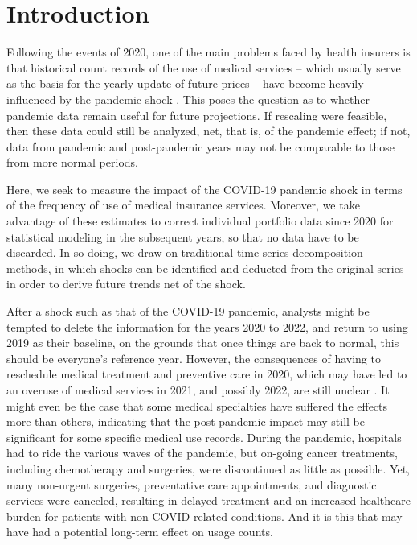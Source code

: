 \documentclass[]{risa}
\begin{document}
\section{Introduction}\label{intro}
Following the events of 2020, one of the main problems faced by health insurers is that historical count records of the use of medical services – which usually serve as the basis for the yearly update of future prices – have become heavily influenced by the pandemic shock \cite{kim2022impact, xu2021impact, cantor2022impact}. This poses the question as to whether pandemic data remain useful for future projections. If rescaling were feasible, then these data could still be analyzed, net, that is, of the pandemic effect; if not, data from pandemic and post-pandemic years may not be comparable to those from more normal periods.

Here, we seek to measure the impact of the COVID-19 pandemic shock in terms of the frequency of use of medical insurance services. Moreover, we take advantage of these estimates to correct individual portfolio data since 2020 for statistical modeling in the subsequent years, so that no data have to be discarded. In so doing, we draw on traditional time series decomposition methods, in which shocks can be identified and deducted from the original series in order to derive future trends net of the shock.

After a shock such as that of the COVID-19 pandemic, analysts might be tempted to delete the information for the years 2020 to 2022, and return to using 2019 as their baseline, on the grounds that once things are back to normal, this should be everyone’s reference year. However, the consequences of having to reschedule medical treatment and preventive care in 2020, which may have led to an overuse of medical services in 2021, and possibly 2022, are still unclear \cite{wilensky2022covid}. It might even be the case that some medical specialties have suffered the effects more than others, indicating that the post-pandemic impact may still be significant for some specific medical use records. During the pandemic, hospitals had to ride the various waves of the pandemic, but on-going cancer treatments, including chemotherapy and surgeries, were discontinued as little as possible. Yet, many non-urgent surgeries, preventative care appointments, and diagnostic services were canceled, resulting in delayed treatment and an increased healthcare burden for patients with non-COVID related conditions. And it is this that may have had a potential long-term effect on usage counts.
\end{document}
